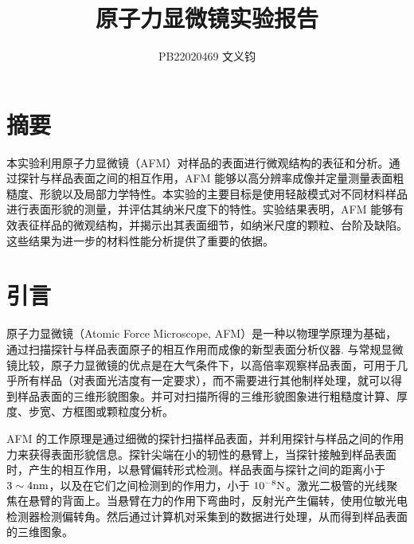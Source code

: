 \documentclass[UTF8]{ctexart}
\title{原子力显微镜实验报告}
\author{PB22020469 文义钧}
\begin{document}
\maketitle

\section{摘要} 
本实验利用原子力显微镜（AFM）对样品的表面进行微观结构的表征和分析。通过探针与样品表面之间的相互作用，AFM 能够以高分辨率成像并定量测量表面粗糙度、形貌以及局部力学特性。本实验的主要目标是使用轻敲模式对不同材料样品进行表面形貌的测量，并评估其纳米尺度下的特性。实验结果表明，AFM 能够有效表征样品的微观结构，并揭示出其表面细节，如纳米尺度的颗粒、台阶及缺陷。这些结果为进一步的材料性能分析提供了重要的依据。
\section{引言}
原子力显微镜（Atomic Force Microscope, AFM）是一种以物理学原理为基础，通过扫描探针与样品表面原子的相互作用而成像的新型表面分析仪器. 与常规显微镜比较，原子力显微镜的优点是在大气条件下，以高倍率观察样品表面，可用于几乎所有样品（对表面光洁度有一定要求），而不需要进行其他制样处理，就可以得到样品表面的三维形貌图象。并可对扫描所得的三维形貌图象进行粗糙度计算、厚度、步宽、方框图或颗粒度分析。\par

AFM 的工作原理是通过细微的探针扫描样品表面，并利用探针与样品之间的作用力来获得表面形貌信息。探针尖端在小的轫性的悬臂上，当探针接触到样品表面时，产生的相互作用，以悬臂偏转形式检测。样品表面与探针之间的距离小于$3\sim4 \rm nm$，以及在它们之间检测到的作用力，小于 $10^{-8} \rm N$。激光二极管的光线聚焦在悬臂的背面上。当悬臂在力的作用下弯曲时，反射光产生偏转，使用位敏光电检测器检测偏转角。然后通过计算机对采集到的数据进行处理，从而得到样品表面的三维图象。\par
\end{document}
